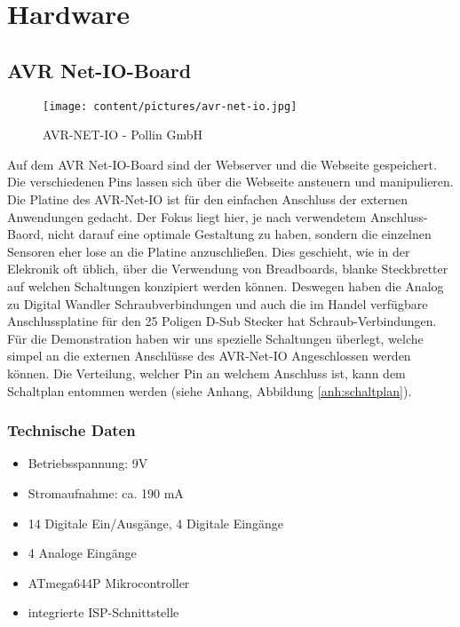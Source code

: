 
\chapter{Hardware}
\section{AVR Net-IO-Board}
\begin{figure}[h]
\centering
\texttt{[image: content/pictures/avr-net-io.jpg]}
\caption{AVR-NET-IO - Pollin GmbH}
\label{fig:B3}
\end{figure}

Auf dem AVR Net-IO-Board sind der Webserver und die Webseite gespeichert. Die
verschiedenen Pins lassen sich über die Webseite ansteuern und manipulieren.
Die Platine des AVR-Net-IO ist für den einfachen Anschluss der externen
Anwendungen gedacht. Der Fokus liegt hier, je nach verwendetem Anschluss-Baord,
nicht darauf eine optimale Gestaltung zu haben, sondern die einzelnen Sensoren
eher lose an die Platine anzuschließen. Dies geschieht, wie in der Elekronik oft
üblich, über die Verwendung von Breadboards, blanke Steckbretter auf
welchen Schaltungen konzipiert werden können. Deswegen haben die Analog zu Digital
Wandler Schraubverbindungen und auch die im Handel verfügbare Anschlussplatine
für den 25 Poligen D-Sub Stecker hat Schraub-Verbindungen. Für die Demonstration
haben wir uns spezielle Schaltungen überlegt, welche simpel an die externen
Anschlüsse des AVR-Net-IO Angeschlossen werden können. Die Verteilung, welcher
Pin an welchem Anschluss ist, kann dem Schaltplan entommen werden (siehe
Anhang, Abbildung \ref{anh:schaltplan}).

\subsection{Technische Daten}
\begin{itemize}
  \item Betriebsspannung: 9V 
  \item Stromaufnahme: ca. 190 mA
  \item 14 Digitale Ein/Ausgänge, 4 Digitale Eingänge
  \item 4 Analoge Eingänge
  \item ATmega644P Mikrocontroller
  \item integrierte ISP-Schnittstelle
\end{itemize}


